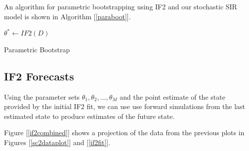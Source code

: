 	An algorithm for parametric bootstrapping using IF2 and our stochastic SIR model is shown in Algorithm [\ref{paraboot}].

	\begin{algorithm}

        \BlankLine

        \DontPrintSemicolon


        \BlankLine

        $\theta^* \gets IF2(D)$

        \BlankLine


        \BlankLine


        \BlankLine


        \caption{Parametric Bootstrap \label{paraboot}}

    \end{algorithm}
	

\subsection{IF2 Forecasts}

	Using the parameter sets $\theta_1, \theta_2, ..., \theta_M$ and the point estimate of the state provided by the initial IF2 fit, we can use use forward simulations from the last estimated state to produce estimates of the future state.

	Figure [\ref{if2combined}] shows a projection of the data from the previous plots in Figures [\ref{sc2dataplot}] and [\ref{if2fit}].

